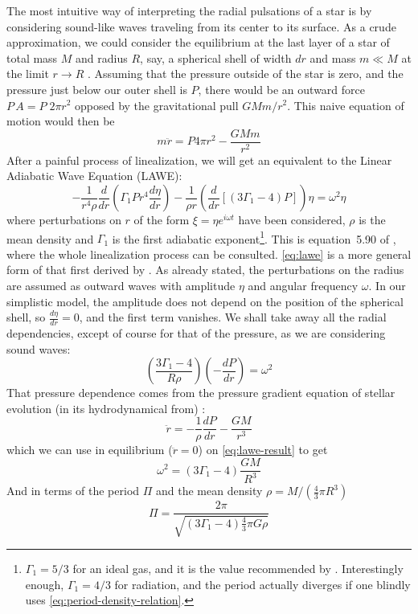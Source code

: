 	The most intuitive way of interpreting the radial pulsations of a star 
	is by considering sound-like waves traveling from its center to its surface.
	As a crude approximation, we could consider the equilibrium at the last layer of a star of total mass $M$ and  radius $R$,
	say, a spherical shell of width $dr$ and mass $m\ll M$ at the limit $r\to R$ . 
	Assuming that the pressure outside of the star is zero, and the pressure just below our outer shell is $P$,
	there would be an outward force $P\,A=P\;2\pi r^2$ opposed by the gravitational pull $GMm/r^2$.
	This naive equation of motion would then be
	\begin{equation}
		m \ddot{r} = P 4\pi r^2 - \frac{GMm}{r^2} \label{eq:period-density-motion}
	\end{equation}
	After a painful process of linealization, we will get an equivalent to the Linear Adiabatic Wave Equation (LAWE):
	\begin{equation}
		-\frac{1}{r^4 \rho} \frac{d}{dr}\left(\Gamma_1P r^4 \frac{d\eta}{dr}\right) - \frac{1}{\rho r}\left(\frac{d}{dr}\left[\left(3\Gamma_1-4\right)P\right]\right)\eta = \omega^2 \eta \label{eq:lawe}
	\end{equation}
	where perturbations on $r$ of the form $\xi = \eta e^{i\omega t}$ have been considered, $\rho$ is the mean density and $\Gamma_1$ is the first adiabatic exponent\footnote{
		$\Gamma_1=5/3$ for an ideal gas, and it is the value recommended by \cite{Cox1980}. 
		Interestingly enough, $\Gamma_1=4/3$ for radiation, and the period actually diverges if one blindly uses \autoref{eq:period-density-relation}.
	}. This is equation~5.90 of \cite{Catelan2015}, where the whole linealization process can be consulted.
	\autoref{eq:lawe} is a more general form of that first derived by \cite{Eddington1918}.
	As already stated, the perturbations on the radius are assumed as outward waves with amplitude $\eta$ and angular frequency $\omega$.
	In our simplistic model, the amplitude does not depend on the position of the spherical shell, so $\frac{d\eta}{dr}=0$, and the first term vanishes.
	We shall take away all the radial dependencies, except of course for that of the pressure, as we are considering sound waves:
	\begin{equation}
		\left(\frac{3 \Gamma_1-4}{R\rho}\right)\left(-\frac{dP}{dr}\right) = \omega^2 \label{eq:lawe-result}
	\end{equation}
	That pressure dependence comes from the pressure gradient equation of stellar evolution (in its hydrodynamical from) \cite[equation 4.18]{Catelan2015}:
	\begin{equation}
		\ddot{r} = -\frac{1}{\rho} \frac{d P}{d r}-\frac{GM}{r^3}
	\end{equation}
	which we can use in equilibrium ($\ddot{r}=0$) on \autoref{eq:lawe-result} to get
	$$
	\omega^2 = (3\Gamma_1-4)\frac{GM}{R^3}
	$$
	And in terms of the period $\Pi$ and the mean density $\rho=M/(\frac{4}{3}\pi R^3)$
	\begin{equation}
		\Pi = \frac{2\pi}{\sqrt{(3\Gamma_1-4)\frac{4}{3}\pi G \rho}} \label{eq:period-density-relation}
	\end{equation}
	
